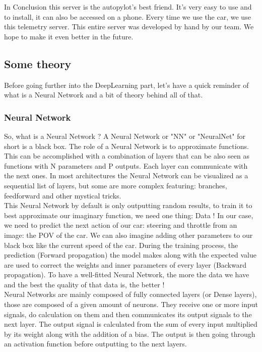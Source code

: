 \documentclass[12pt]{article}
\begin{document}
In Conclusion this server is the autopylot’s best friend. It’s very easy to use and to install, it can also be accessed on a phone. Every time we use the car, we use this telemetry server. This entire server was developed by hand by our team. We hope to make it even better in the future.

\subsection{Some theory}
Before going further into the DeepLearning part, let's have a quick reminder of what is a Neural Network and a bit of theory behind all of that. \\

\subsubsection{Neural Network}
So, what is a Neural Network ? 
A Neural Network or "NN" or "NeuralNet" for short is a black box. The role of a Neural Network is to approximate functions. This can be accomplished with a combination of layers that can be also seen as functions with N parameters and P outputs. Each layer can communicate with the next ones. In most architectures the Neural Network can be visualized as a sequential list of layers, but some are more complex featuring: branches, feedforward and other mystical tricks. \\

This Neural Network by default is only outputting random results, to train it to best approximate our imaginary function, we need one thing: Data ! In our case, we need to predict the next action of our car: steering and throttle from an image: the POV of the car. We can also imagine adding other parameters to our black box like the current speed of the car.
During the training process, the prediction (Forward propagation) the model makes along with the expected value are used to correct the weights and inner parameters of every layer (Backward propagation). To have a well-fitted Neural Network, the more the data we have and the best the quality of that data is, the better ! \\

Neural Networks are mainly composed of fully connected layers (or Dense layers), those are composed of a given amount of neurons. They receive one or more input signals, do calculation on them and then communicates its output signals to the next layer. The output signal is calculated from the sum of every input multiplied by its weight along with the addition of a bias. The output is then going through an activation function before outputting to the next layers. \\
\end{document}
